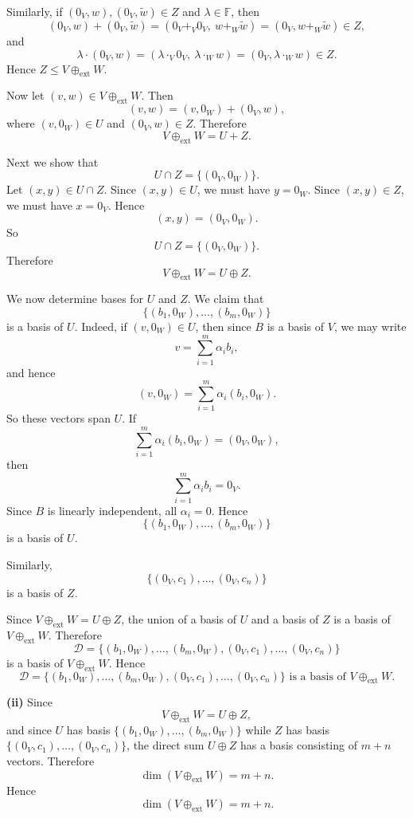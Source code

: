 \documentclass[12pt]{article}
\begin{document}
Similarly, if \((0_V,w),(0_V,\tilde w)\in Z\) and \(\lambda\in\mathbb F\), then
\[
(0_V,w)+(0_V,\tilde w)=(0_V+_V0_V,\ w+_W\tilde w)=(0_V,w+_W\tilde w)\in Z,
\]
and
\[
\lambda\cdot(0_V,w)=(\lambda\cdot_V0_V,\ \lambda\cdot_W w)=(0_V,\lambda\cdot_W w)\in Z.
\]
Hence \(Z\le V\oplus_{\mathrm{ext}}W\).

Now let \((v,w)\in V\oplus_{\mathrm{ext}}W\). Then
\[
(v,w)=(v,0_W)+(0_V,w),
\]
where \((v,0_W)\in U\) and \((0_V,w)\in Z\). Therefore
\[
V\oplus_{\mathrm{ext}}W=U+Z.
\]

Next we show that
\[
U\cap Z=\{(0_V,0_W)\}.
\]
Let \((x,y)\in U\cap Z\). Since \((x,y)\in U\), we must have \(y=0_W\). Since \((x,y)\in Z\), we must have \(x=0_V\). Hence
\[
(x,y)=(0_V,0_W).
\]
So
\[
U\cap Z=\{(0_V,0_W)\}.
\]
Therefore
\[
V\oplus_{\mathrm{ext}}W=U\oplus Z.
\]

We now determine bases for \(U\) and \(Z\). We claim that
\[
\{(b_1,0_W),\ldots,(b_m,0_W)\}
\]
is a basis of \(U\). Indeed, if \((v,0_W)\in U\), then since \(B\) is a basis of \(V\), we may write
\[
v=\sum_{i=1}^m \alpha_i b_i,
\]
and hence
\[
(v,0_W)=\sum_{i=1}^m \alpha_i (b_i,0_W).
\]
So these vectors span \(U\). If
\[
\sum_{i=1}^m \alpha_i (b_i,0_W)=(0_V,0_W),
\]
then
\[
\sum_{i=1}^m \alpha_i b_i=0_V.
\]
Since \(B\) is linearly independent, all \(\alpha_i=0\). Hence
\[
\{(b_1,0_W),\ldots,(b_m,0_W)\}
\]
is a basis of \(U\).

Similarly,
\[
\{(0_V,c_1),\ldots,(0_V,c_n)\}
\]
is a basis of \(Z\).

Since \(V\oplus_{\mathrm{ext}}W=U\oplus Z\), the union of a basis of \(U\) and a basis of \(Z\) is a basis of \(V\oplus_{\mathrm{ext}}W\). Therefore
\[
\mathcal D
=
\{(b_1,0_W),\ldots,(b_m,0_W),(0_V,c_1),\ldots,(0_V,c_n)\}
\]
is a basis of \(V\oplus_{\mathrm{ext}}W\). Hence
\[
\boxed{\mathcal D=\{(b_1,0_W),\ldots,(b_m,0_W),(0_V,c_1),\ldots,(0_V,c_n)\}\text{ is a basis of }V\oplus_{\mathrm{ext}}W.}
\]

\noindent \textbf{(ii)} Since
\[
V\oplus_{\mathrm{ext}}W=U\oplus Z,
\]
and since \(U\) has basis \(\{(b_1,0_W),\ldots,(b_m,0_W)\}\) while \(Z\) has basis \(\{(0_V,c_1),\ldots,(0_V,c_n)\}\), the direct sum \(U\oplus Z\) has a basis consisting of \(m+n\) vectors. Therefore
\[
\dim(V\oplus_{\mathrm{ext}}W)=m+n.
\]
Hence
\[
\boxed{\dim(V\oplus_{\mathrm{ext}}W)=m+n.}
\]
\newpage
\end{document}
